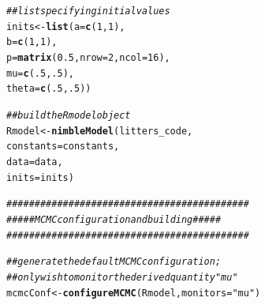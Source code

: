 \documentclass[12pt,oneside]{book}\usepackage[]{graphicx}\usepackage[]{color}
\makeatletter
\newcommand{\hlnum}[1]{\textcolor[rgb]{0.686,0.059,0.569}{#1}}%
\newcommand{\hlstr}[1]{\textcolor[rgb]{0.192,0.494,0.8}{#1}}%
\newcommand{\hlcom}[1]{\textcolor[rgb]{0.678,0.584,0.686}{\textit{#1}}}%
\newcommand{\hlstd}[1]{\textcolor[rgb]{0.345,0.345,0.345}{#1}}%
\newcommand{\hlkwb}[1]{\textcolor[rgb]{0.69,0.353,0.396}{#1}}%
\newcommand{\hlkwc}[1]{\textcolor[rgb]{0.333,0.667,0.333}{#1}}%
\newcommand{\hlkwd}[1]{\textcolor[rgb]{0.737,0.353,0.396}{\textbf{#1}}}%
\newenvironment{kframe}{%
 \def\at@end@of@kframe{}%
 \ifinner\ifhmode%
  \def\at@end@of@kframe{\end{minipage}}%
  \begin{minipage}{\columnwidth}%
 \fi\fi%
 \def\FrameCommand##1{\hskip\@totalleftmargin \hskip-\fboxsep
 \colorbox{shadecolor}{##1}\hskip-\fboxsep
     \hskip-\linewidth \hskip-\@totalleftmargin \hskip\columnwidth}%
 \MakeFramed {\advance\hsize-\width
   \@totalleftmargin\z@ \linewidth\hsize
   \@setminipage}}%
 {\par\unskip\endMakeFramed%
 \at@end@of@kframe}
\newenvironment{knitrout}{}{} %
\makeatother
\begin{document}
\begin{knitrout}
\begin{kframe}
\begin{alltt}
\hlcom{## list specifying initial values}
\hlstd{inits} \hlkwb{<-} \hlkwd{list}\hlstd{(}\hlkwc{a} \hlstd{=} \hlkwd{c}\hlstd{(}\hlnum{1}\hlstd{,} \hlnum{1}\hlstd{),}
              \hlkwc{b} \hlstd{=} \hlkwd{c}\hlstd{(}\hlnum{1}\hlstd{,} \hlnum{1}\hlstd{),}
              \hlkwc{p} \hlstd{=} \hlkwd{matrix}\hlstd{(}\hlnum{0.5}\hlstd{,} \hlkwc{nrow} \hlstd{=} \hlnum{2}\hlstd{,} \hlkwc{ncol} \hlstd{=} \hlnum{16}\hlstd{),}
              \hlkwc{mu}    \hlstd{=} \hlkwd{c}\hlstd{(}\hlnum{.5}\hlstd{,} \hlnum{.5}\hlstd{),}
              \hlkwc{theta} \hlstd{=} \hlkwd{c}\hlstd{(}\hlnum{.5}\hlstd{,} \hlnum{.5}\hlstd{))}

\hlcom{## build the R model object}
\hlstd{Rmodel} \hlkwb{<-} \hlkwd{nimbleModel}\hlstd{(litters_code,}
                      \hlkwc{constants} \hlstd{= constants,}
                      \hlkwc{data}      \hlstd{= data,}
                      \hlkwc{inits}     \hlstd{= inits)}


\hlcom{###########################################}
\hlcom{##### MCMC configuration and building #####}
\hlcom{###########################################}

\hlcom{## generate the default MCMC configuration;}
\hlcom{## only wish to monitor the derived quantity "mu"}
\hlstd{mcmcConf} \hlkwb{<-} \hlkwd{configureMCMC}\hlstd{(Rmodel,} \hlkwc{monitors} \hlstd{=} \hlstr{"mu"}\hlstd{)}


\end{alltt}
\end{kframe}
\end{knitrout}
\end{document}

